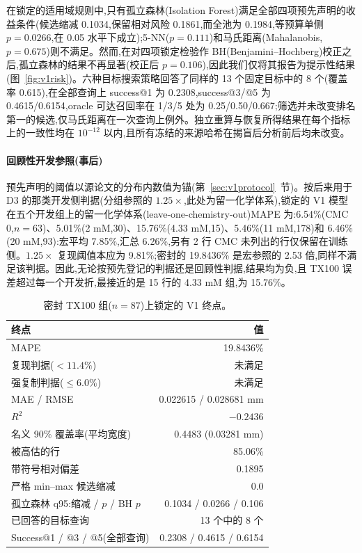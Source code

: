 \documentclass[11pt,a4paper]{ctexart}
\begin{document}
在锁定的适用域规则中,只有孤立森林(Isolation Forest)满足全部四项预先声明的收益条件(候选缩减 0.1034,保留相对风险 0.1861,而全池为 0.1984,等预算单侧 $p=0.0266$,在 0.05 水平下成立);5-NN($p=0.111$)和马氏距离(Mahalanobis,$p=0.675$)则不满足。然而,在对四项锁定检验作 BH(Benjamini–Hochberg)校正之后,孤立森林的结果不再显著(校正后 $p=0.106$),因此我们仅将其报告为提示性结果(图~\ref{fig:v1risk})。六种目标搜索策略回答了同样的 13 个固定目标中的 8 个(覆盖率 0.615),在全部查询上 success@1 为 0.2308,success@3/@5 为 0.4615/0.6154,oracle 可达召回率在 1/3/5 处为 0.25/0.50/0.667;筛选并未改变排名第一的候选,仅马氏距离在一次查询上例外。独立重算与恢复所得结果在每个指标上的一致性均在 $10^{-12}$ 以内,且所有冻结的来源哈希在揭盲后分析前后均未改变。

\paragraph{回顾性开发参照(事后)} 预先声明的阈值以源论文的分布内数值为锚(第~\ref{sec:v1protocol}~节)。按后来用于 D3 的那类开发侧判据(分组参照的 $1.25\times$,此处为留一化学体系),锁定的 V1 模型在五个开发组上的留一化学体系(leave-one-chemistry-out)MAPE 为:6.54\%(CMC 0,$n=63$)、5.01\%(2 mM,30)、15.76\%(4.33 mM,15)、5.46\%(11 mM,178)和 6.46\%(20 mM,93):宏平均 7.85\%,汇总 6.26\%,另有 2 行 CMC 未列出的行仅保留在训练侧。$1.25\times$ 复现阈值本应为 9.81\%;密封的 19.8436\% 是宏参照的 2.53 倍,同样不满足该判据。因此,无论按预先登记的判据还是回顾性判据,结果均为负,且 TX100 误差超过每一个开发折,最接近的是 15 行的 4.33 mM 组,为 15.76\%。

\begin{table}[t]
\centering\small
\caption{密封 TX100 组($n=87$)上锁定的 V1 终点。}
\label{tab:v1}
\begin{tabular}{lr}
\toprule
终点 & 值 \\
\midrule
MAPE & 19.8436\% \\
复现判据($<11.4\%$) & 未满足 \\
强复制判据($\le 6.0\%$) & 未满足 \\
MAE / RMSE & 0.022615 / 0.028681 mm \\
$R^2$ & $-0.2436$ \\
名义 90\% 覆盖率(平均宽度) & 0.4483 (0.03281 mm) \\
被高估的行 & 85.06\% \\
带符号相对偏差 & 0.1895 \\
严格 min–max 候选缩减 & 0.0 \\
孤立森林 q95:缩减 / $p$ / BH $p$ & 0.1034 / 0.0266 / 0.106 \\
已回答的目标查询 & 13 个中的 8 个 \\
Success@1 / @3 / @5(全部查询) & 0.2308 / 0.4615 / 0.6154 \\
\bottomrule
\end{tabular}
\end{table}
\end{document}
